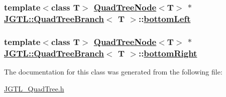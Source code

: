 \hypertarget{class_j_g_t_l_1_1_quad_tree_branch_3359e420228b5e7fd9f272b85e7517d8}{
\subsubsection[bottomLeft]{\setlength{\rightskip}{0pt plus 5cm}template$<$class T$>$ \hyperlink{class_j_g_t_l_1_1_quad_tree_node}{Quad\-Tree\-Node}$<$T$>$ $\ast$ \hyperlink{class_j_g_t_l_1_1_quad_tree_branch}{JGTL::Quad\-Tree\-Branch}$<$ T $>$::\hyperlink{class_j_g_t_l_1_1_quad_tree_branch_3359e420228b5e7fd9f272b85e7517d8}{bottom\-Left}}}
\label{class_j_g_t_l_1_1_quad_tree_branch_3359e420228b5e7fd9f272b85e7517d8}


\hypertarget{class_j_g_t_l_1_1_quad_tree_branch_a297958fd688ab38cb43e12a24a17020}{
\subsubsection[bottomRight]{\setlength{\rightskip}{0pt plus 5cm}template$<$class T$>$ \hyperlink{class_j_g_t_l_1_1_quad_tree_node}{Quad\-Tree\-Node}$<$T$>$ $\ast$ \hyperlink{class_j_g_t_l_1_1_quad_tree_branch}{JGTL::Quad\-Tree\-Branch}$<$ T $>$::\hyperlink{class_j_g_t_l_1_1_quad_tree_branch_a297958fd688ab38cb43e12a24a17020}{bottom\-Right}}}
\label{class_j_g_t_l_1_1_quad_tree_branch_a297958fd688ab38cb43e12a24a17020}




The documentation for this class was generated from the following file:\begin{CompactItemize}
\item 
\hyperlink{_j_g_t_l___quad_tree_8h}{JGTL\_\-Quad\-Tree.h}\end{CompactItemize}
